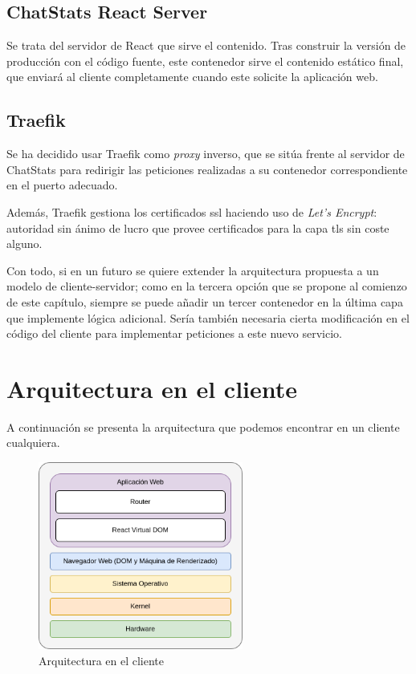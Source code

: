 \subsection{ChatStats React Server}

Se trata del servidor de React que sirve el contenido. Tras construir la versión de producción con el código fuente, este contenedor sirve el contenido estático final, que enviará al cliente completamente cuando este solicite la aplicación web.

\subsection{Traefik}

Se ha decidido usar Traefik como \textit{proxy} inverso, que se sitúa frente al servidor de ChatStats para redirigir las peticiones realizadas a su contenedor correspondiente en el puerto adecuado.

Además, Traefik gestiona los certificados \acrshort{ssl} haciendo uso de \textit{Let's Encrypt}: autoridad sin ánimo de lucro que provee certificados para la capa \acrshort{tls} sin coste alguno.

\vspace{8mm}

Con todo, si en un futuro se quiere extender la arquitectura propuesta a un modelo de cliente-servidor; como en la tercera opción que se propone al comienzo de este capítulo, siempre se puede añadir un tercer contenedor en la última capa que implemente lógica adicional. Sería también necesaria cierta modificación en el código del cliente para implementar peticiones a este nuevo servicio.



\section{Arquitectura en el cliente}

A continuación se presenta la arquitectura que podemos encontrar en un cliente cualquiera.

\begin{figure}[H]
	\centering
	\includegraphics[width=0.6\textwidth]{img/client.png}
	\caption{Arquitectura en el cliente}
	\label{fig:chap4:architecture_client}
\end{figure}

